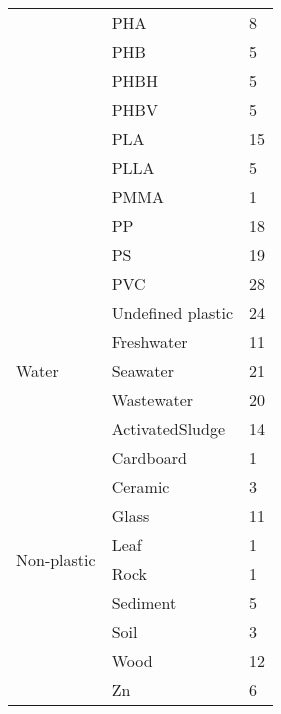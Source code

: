 \begin{table}[H]
\begin{tabular}{@{}lll@{}}
                              & PHA                & 8          \\
                              & PHB                & 5          \\
                              & PHBH               & 5          \\
                              & PHBV               & 5          \\
                              & PLA                & 15         \\
                              & PLLA               & 5          \\
                              & PMMA               & 1          \\
                              & PP                 & 18         \\
                              & PS                 & 19         \\
                              & PVC                & 28         \\
                              & Undefined plastic  & 24         \\ \midrule
\multirow{3}{*}{Water}        & Freshwater         & 11         \\
                              & Seawater           & 21         \\
                              & Wastewater         & 20         \\
\multirow{10}{*}{Non-plastic} & ActivatedSludge    & 14         \\ \midrule
                              & Cardboard          & 1          \\
                              & Ceramic            & 3          \\
                              & Glass              & 11         \\
                              & Leaf               & 1          \\
                              & Rock               & 1          \\
                              & Sediment           & 5          \\
                              & Soil               & 3          \\
                              & Wood               & 12         \\
                              & Zn                 & 6          \\ \bottomrule
\end{tabular}
\end{table}
